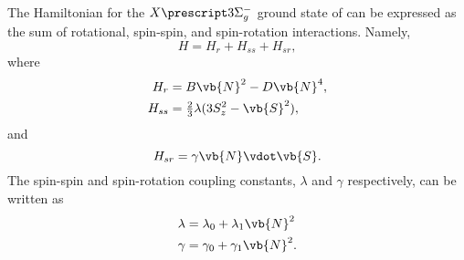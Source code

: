 The Hamiltonian for the $X\state{3}{\Sigma}_g^{-}$ ground state of  can be expressed as the sum of rotational, spin-spin, and spin-rotation interactions.
Namely, \cite[1394]{amiotMagneticDipole1Dg1981}
\begin{equation*}
    H = H_r + H_{ss} + H_{sr},
\end{equation*}
where
\begin{align*}
    H_r  & = B\vb{N}^2 - D\vb{N}^4,                    \\
    H_{ss} & = \tfrac{2}{3}\lambda(3S_z^2 - \vb{S}^2),
\end{align*}
and
\begin{equation*}
    H_{sr} = \gamma\vb{N}\vdot\vb{S}.
\end{equation*}
The spin-spin and spin-rotation coupling constants, $\lambda$ and $\gamma$ respectively, can be written as
\begin{align*}
    \lambda & = \lambda_0 + \lambda_1\vb{N}^2 \\
    \gamma  & = \gamma_0 + \gamma_1\vb{N}^2.
\end{align*}

